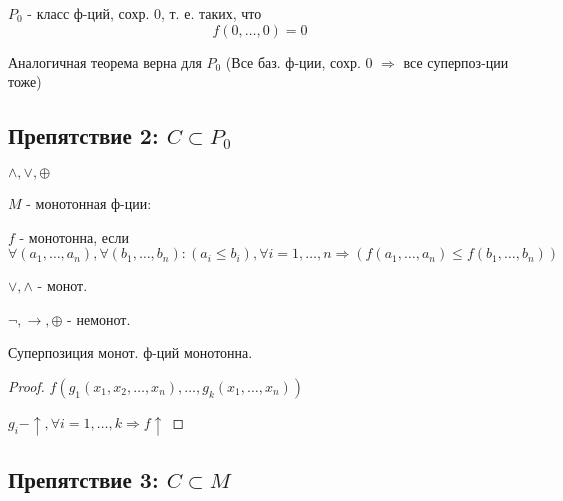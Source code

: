 \begin{definition}
$P_0$ - класс ф-ций, сохр. 0, т. е. таких, что
\[
  f(0, \ldots, 0) = 0
\]

Аналогичная теорема верна для $P_0$ (Все баз. ф-ции, сохр. 0 $\Rightarrow$ все суперпоз-ции тоже)
\end{definition}
\subsection{Препятствие 2: $C \subset P_0$}
\begin{example}
 $\land, \lor, \oplus $
\end{example}

\begin{definition}
$M$ - монотонная ф-ции:

$f$ - монотонна, если $\forall (a_1, \ldots, a_n), \forall (b_1, \ldots, b_n) \colon (a_i \leq b_i), \forall i=1,\ldots,n \Rightarrow (f(a_1, \ldots, a_n) \leq f(b_1, \ldots, b_n))$
\end{definition}

\begin{example}
$\lor, \land$ - монот.

$\neg, \rightarrow, \oplus$ - немонот.
\end{example}
\begin{statement}
Суперпозиция монот. ф-ций монотонна.
\end{statement}
\begin{proof}
$f(g_1(x_1, x_2, \ldots, x_n), \ldots, g_k(x_1, \ldots, x_n))$

$g_i - \uparrow, \forall i = 1, \ldots , k \Rightarrow f \uparrow$
\end{proof}
\subsection{Препятствие 3: $C \subset M$}
